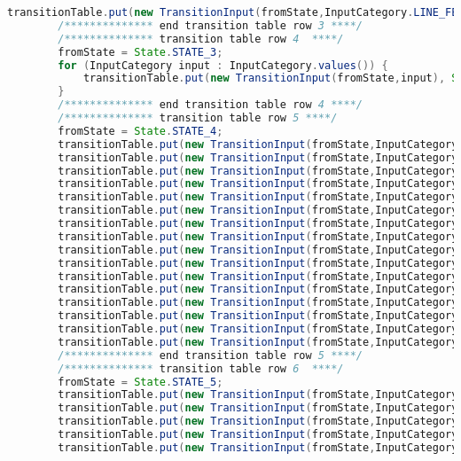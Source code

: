 \begin{lstlisting}[basicstyle=\miniscule,language=Java,caption=Implementation of transition table,label=listing:transition table]
		transitionTable.put(new TransitionInput(fromState,InputCategory.LINE_FEED), State.STATE_ERROR);
		/************** end transition table row 3 ****/
		/************** transition table row 4  ****/
		fromState = State.STATE_3;
		for (InputCategory input : InputCategory.values()) {
			transitionTable.put(new TransitionInput(fromState,input), State.STATE_ERROR);
		}
		/************** end transition table row 4 ****/
		/************** transition table row 5 ****/
		fromState = State.STATE_4;
		transitionTable.put(new TransitionInput(fromState,InputCategory.LETTER), State.STATE_4);
		transitionTable.put(new TransitionInput(fromState,InputCategory.DIGIT), State.STATE_4);
		transitionTable.put(new TransitionInput(fromState,InputCategory.UNDERSCORE), State.STATE_4);
		transitionTable.put(new TransitionInput(fromState,InputCategory.SLASH_DIVIDE), State.STATE_ERROR);
		transitionTable.put(new TransitionInput(fromState,InputCategory.ASTERISK), State.STATE_ERROR);
		transitionTable.put(new TransitionInput(fromState,InputCategory.LESS_THAN), State.STATE_ERROR);
		transitionTable.put(new TransitionInput(fromState,InputCategory.GREATER_THAN), State.STATE_ERROR);
		transitionTable.put(new TransitionInput(fromState,InputCategory.PLUS), State.STATE_ERROR);
		transitionTable.put(new TransitionInput(fromState,InputCategory.HYPHEN_MINUS), State.STATE_ERROR);
		transitionTable.put(new TransitionInput(fromState,InputCategory.EQUAL), State.STATE_ERROR);
		transitionTable.put(new TransitionInput(fromState,InputCategory.EXCLAMATION_MARK), State.STATE_ERROR);
		transitionTable.put(new TransitionInput(fromState,InputCategory.DOT), State.STATE_ERROR);
		transitionTable.put(new TransitionInput(fromState,InputCategory.SINGLE_QUOTE), State.STATE_ERROR);
		transitionTable.put(new TransitionInput(fromState,InputCategory.PUNCT), State.STATE_ERROR);
		transitionTable.put(new TransitionInput(fromState,InputCategory.OTHER_PRINTABLE), State.STATE_ERROR);
		transitionTable.put(new TransitionInput(fromState,InputCategory.LINE_FEED), State.STATE_ERROR);
		/************** end transition table row 5 ****/
		/************** transition table row 6  ****/
		fromState = State.STATE_5;
		transitionTable.put(new TransitionInput(fromState,InputCategory.LETTER), State.STATE_ERROR);
		transitionTable.put(new TransitionInput(fromState,InputCategory.DIGIT), State.STATE_ERROR);
		transitionTable.put(new TransitionInput(fromState,InputCategory.UNDERSCORE), State.STATE_ERROR);
		transitionTable.put(new TransitionInput(fromState,InputCategory.SLASH_DIVIDE), State.STATE_6);
		transitionTable.put(new TransitionInput(fromState,InputCategory.ASTERISK), State.STATE_7);

\end{lstlisting}
